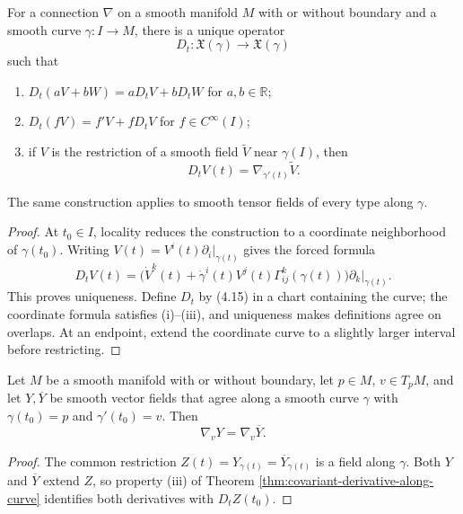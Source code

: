 \begin{theorem}
\label{thm:covariant-derivative-along-curve}
\leanok
For a connection $\nabla$ on a smooth manifold $M$ with or without boundary and
a smooth curve $\gamma\colon I\to M$, there is a unique operator
\[
D_t\colon\mathfrak{X}(\gamma)\to\mathfrak{X}(\gamma)
\]
such that
\begin{enumerate}
\item[(i)] $D_t(aV+bW)=aD_tV+bD_tW$ for $a,b\in\mathbb R$;
\item[(ii)] $D_t(fV)=f'V+fD_tV$ for $f\in C^\infty(I)$;
\item[(iii)] if $V$ is the restriction of a smooth field $\widetilde V$ near
$\gamma(I)$, then
\[
D_tV(t)=\nabla_{\gamma'(t)}\widetilde V.
\]
\end{enumerate}
The same construction applies to smooth tensor fields of every type along
$\gamma$.
\end{theorem}
\begin{proof}
\leanok
\sketch At $t_0\in I$, locality reduces the construction to a coordinate
neighborhood of $\gamma(t_0)$. Writing
$V(t)=V^i(t)\partial_i|_{\gamma(t)}$ gives the forced formula
\begin{equation}
D_tV(t)=\bigl(\dot V^k(t)+\dot\gamma^i(t)V^j(t)\Gamma^k_{ij}(\gamma(t))\bigr)
\partial_k|_{\gamma(t)}.\tag{4.15}
\end{equation}
This proves uniqueness. Define $D_t$ by (4.15) in a chart containing the curve;
the coordinate formula satisfies (i)--(iii), and uniqueness makes definitions
agree on overlaps. At an endpoint, extend the coordinate curve to a slightly
larger interval before restricting.
\end{proof}

\begin{proposition}
\label{prop:covariant-derivative-depends-on-curve}
Let $M$ be a smooth manifold with or without boundary, let $p\in M$,
$v\in T_pM$, and let $Y,\overline Y$ be smooth vector fields
that agree along a smooth curve $\gamma$ with $\gamma(t_0)=p$ and
$\gamma'(t_0)=v$. Then
\[
\nabla_vY=\nabla_v\overline Y.
\]
\end{proposition}
\begin{proof}
\sketch The common restriction $Z(t)=Y_{\gamma(t)}=\overline Y_{\gamma(t)}$
is a field along $\gamma$. Both $Y$ and $\overline Y$ extend $Z$, so property
(iii) of Theorem \ref{thm:covariant-derivative-along-curve} identifies both
derivatives with $D_tZ(t_0)$.
\end{proof}
